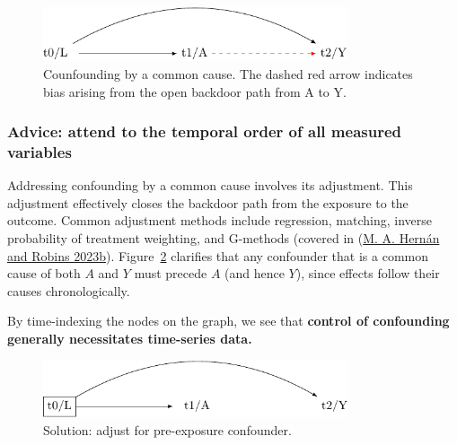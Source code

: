 \documentclass[
  singlecolumn]{article}
\begin{document}
\begin{figure}

{\centering \includegraphics[width=0.8\textwidth,height=\textheight]{causal-dags_files/figure-pdf/fig-dag-common-cause-1.pdf}

}

\caption{\label{fig-dag-common-cause}Counfounding by a common cause. The
dashed red arrow indicates bias arising from the open backdoor path from
A to Y.}

\end{figure}

\hypertarget{advice-attend-to-the-temporal-order-of-all-measured-variables}{%
\subsubsection{Advice: attend to the temporal order of all measured
variables}\label{advice-attend-to-the-temporal-order-of-all-measured-variables}}

Addressing confounding by a common cause involves its adjustment. This
adjustment effectively closes the backdoor path from the exposure to the
outcome. Common adjustment methods include regression, matching, inverse
probability of treatment weighting, and G-methods (covered in
(\protect\hyperlink{ref-hernuxe1n2023a}{M. A. Hernán and Robins 2023b}).
Figure~\ref{fig-dag-common-cause-solution} clarifies that any confounder
that is a common cause of both \(A\) and \(Y\) must precede \(A\) (and
hence \(Y\)), since effects follow their causes chronologically.

By time-indexing the nodes on the graph, we see that \textbf{control of
confounding generally necessitates time-series data.}

\begin{figure}

{\centering \includegraphics[width=0.8\textwidth,height=\textheight]{causal-dags_files/figure-pdf/fig-dag-common-cause-solution-1.pdf}

}

\caption{\label{fig-dag-common-cause-solution}Solution: adjust for
pre-exposure confounder.}

\end{figure}
\end{document}
